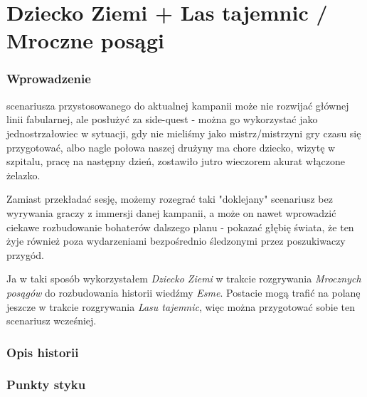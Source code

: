 \clearpage

\part{Dziecko Ziemi + Las tajemnic / Mroczne posągi}

\begin{twocolumn}

\section{Wprowadzenie}

 scenariusza przystosowanego do aktualnej kampanii może nie rozwijać
głównej linii fabularnej, ale posłużyć za side-quest - można go wykorzystać jako jednostrzałowiec w sytuacji, gdy nie
mieliśmy jako mistrz/mistrzyni gry czasu się przygotować, albo nagle połowa naszej drużyny ma chore dziecko, wizytę w
szpitalu, pracę na następny dzień, zostawiło jutro wieczorem akurat włączone żelazko.

Zamiast przekładać sesję, możemy rozegrać taki "doklejany" scenariusz bez wyrywania graczy z immersji danej kampanii, a
może on nawet wprowadzić ciekawe rozbudowanie bohaterów dalszego planu - pokazać głębię świata, że ten żyje również poza
wydarzeniami bezpośrednio śledzonymi przez poszukiwaczy przygód.

Ja w taki sposób wykorzystałem \emph{Dziecko Ziemi}\cite{dziecko_ziemi} w trakcie rozgrywania \emph{Mrocznych posągów}
\cite{mroczne_posagi} do rozbudowania historii wiedźmy \emph{Esme}. Postacie mogą trafić na polanę jeszcze w trakcie
rozgrywania \emph{Lasu tajemnic}\cite{las_tajemnic}, więc można przygotować sobie ten scenariusz wcześniej.

\section{Opis historii}


\section{Punkty styku}



\end{twocolumn}
